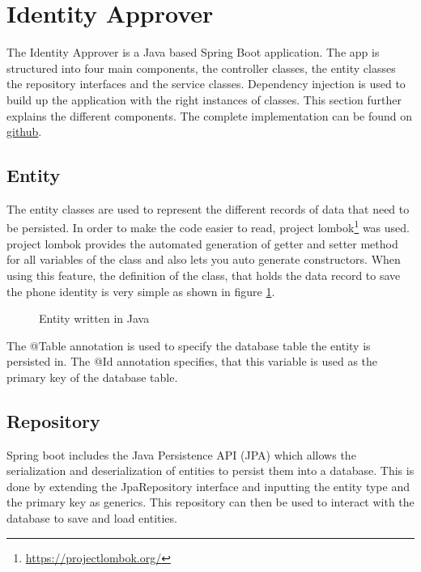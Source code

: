 \section{Identity Approver}\label{imp:identity}
The Identity Approver is a Java based Spring Boot application. The app is structured into four main components, the controller classes, the entity classes the repository interfaces and the service classes. Dependency injection is used to build up the application with the right instances of classes.
This section further explains the different components. The complete implementation can be found on \href{https://github.com/bc-ticketing/identity-approver}{github}.

\subsection{Entity}
The entity classes are used to represent the different records of data that need to be persisted. In order to make the code easier to read, project lombok\footnote{\url{https://projectlombok.org/}} was used. project lombok provides the automated generation of getter and setter method for all variables of the class and also lets you auto generate constructors. When using this feature, the definition of the class, that holds the data record to save the phone identity is very simple as shown in figure \ref{code:entity}. 


\begin{figure}[H]
    
    \caption{Entity written in Java}
    \label{code:entity}
\end{figure}

The @Table annotation is used to specify the database table the entity is persisted in. The @Id annotation specifies, that this variable is used as the primary key of the database table.




\subsection{Repository}
Spring boot includes the Java Persistence API (JPA) which allows the serialization and deserialization of entities to persist them into a database. This is done by extending the JpaRepository interface and inputting the entity type and the primary key as generics. This repository can then be used to interact with the database to save and load entities. 

